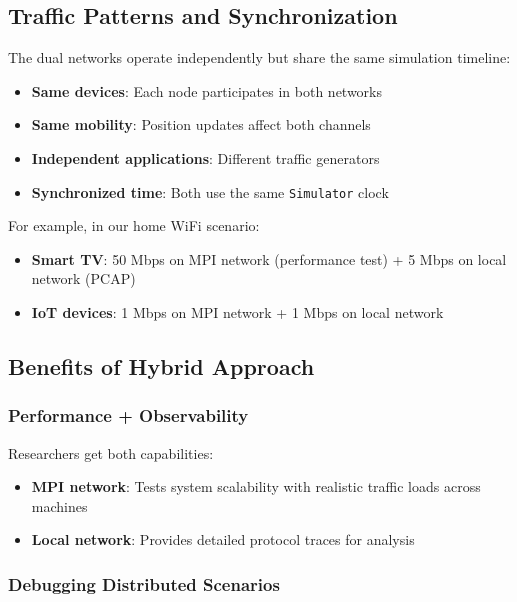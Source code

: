 \subsection{Traffic Patterns and Synchronization}

The dual networks operate independently but share the same simulation timeline:

\begin{itemize}
    \item \textbf{Same devices}: Each node participates in both networks
    \item \textbf{Same mobility}: Position updates affect both channels
    \item \textbf{Independent applications}: Different traffic generators
    \item \textbf{Synchronized time}: Both use the same \texttt{Simulator} clock
\end{itemize}

For example, in our home WiFi scenario:
\begin{itemize}
    \item \textbf{Smart TV}: 50 Mbps on MPI network (performance test) + 5 Mbps on local network (PCAP)
    \item \textbf{IoT devices}: 1 Mbps on MPI network + 1 Mbps on local network
\end{itemize}

\subsection{Benefits of Hybrid Approach}

\subsubsection{Performance + Observability}

Researchers get both capabilities:
\begin{itemize}
    \item \textbf{MPI network}: Tests system scalability with realistic traffic loads across machines
    \item \textbf{Local network}: Provides detailed protocol traces for analysis
\end{itemize}

\subsubsection{Debugging Distributed Scenarios}

